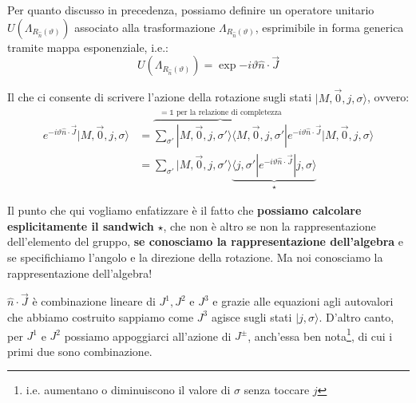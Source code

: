 \documentclass[../main.tex]{subfiles}
\begin{document}
\begin{enumerate}
    Per quanto discusso in precedenza, possiamo definire un operatore unitario \(U(\Lambda_{R_{\hat{n}}(\vartheta)})\) associato alla trasformazione \(\Lambda_{R_{\hat{n}}(\vartheta)}\), esprimibile in forma generica tramite mappa esponenziale, i.e.:
    \[
    U(\Lambda_{R_{\hat{n}}(\vartheta)}) = \exp{-i\vartheta\hat{n}\cdot \Vec{J}}
    \]

    Il che ci consente di scrivere l'azione della rotazione sugli stati \(|M, \Vec{0}, j, \sigma\rangle\), ovvero: 
    \begin{align*}
        e^{-i\vartheta \hat{n}\cdot \Vec{J}}|M, \Vec{0}, j, \sigma\rangle 
        &= \overbrace{\sum_{\sigma'}|M, \Vec{0}, j, \sigma'\rangle \langle M, \Vec{0}, j, \sigma' |}^{=\mathbb 1\text{ per la relazione di completezza}} e^{-i\vartheta \hat{n}\cdot \Vec{J}}|M, \Vec{0}, j, \sigma\rangle \\
        &= \sum_{\sigma'}|M, \Vec{0}, j, \sigma'\rangle 
        \underbrace{\langle j, \sigma' | e^{-i\vartheta \hat{n}\cdot \Vec{J}}| j, \sigma\rangle}_{\star}
    \end{align*}

    Il punto che qui vogliamo enfatizzare è il fatto che \textbf{possiamo calcolare esplicitamente il sandwich} $\star$, che non è altro se non la rappresentazione dell'elemento del gruppo,\textbf{ se conosciamo la rappresentazione dell'algebra} e se specifichiamo l'angolo e la direzione della rotazione. Ma noi conosciamo la rappresentazione dell'algebra!

    $\hat{n}\cdot \Vec{J}$ è combinazione lineare di $J^1, J^2$ e $J^3$ e grazie alle equazioni agli autovalori che abbiamo costruito sappiamo come $J^3$ agisce sugli stati $| j, \sigma\rangle$. D'altro canto, per $J^1$ e $J^2$ possiamo appoggiarci all'azione di $J^\pm$, anch'essa ben nota\footnote{i.e. aumentano o diminuiscono il valore di $\sigma$ senza toccare $j$}, di cui i primi due sono combinazione.


\end{enumerate}
\end{document}
